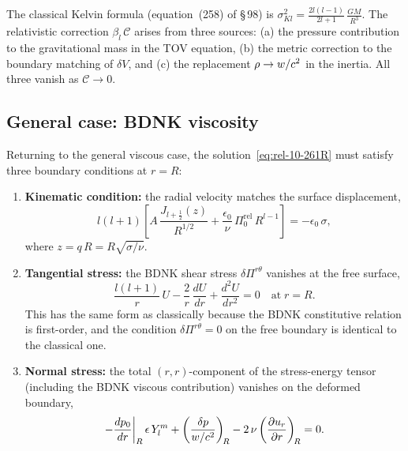 \begin{relcorrection}
The classical Kelvin formula (equation~(258) of \S\,98) is
$\sigma_{Kl}^{2} = \tfrac{2l(l-1)}{2l+1}\,\tfrac{GM}{R^{3}}$.
The relativistic correction $\beta_{l}\,\mathcal{C}$ arises from
three sources: (a) the pressure contribution to the gravitational
mass in the TOV equation, (b) the metric correction to the
boundary matching of $\delta V$, and (c) the replacement
$\rho \to w/c^{2}$ in the inertia.  All three vanish
as $\mathcal{C}\to 0$.
\end{relcorrection}

\subsection{General case: BDNK viscosity}
\label{sec:rel-10-98-general}

Returning to the general viscous case, the solution~\eqref{eq:rel-10-261R}
must satisfy three boundary conditions at $r = R$:

\begin{enumerate}
\item \textbf{Kinematic condition:} the radial velocity matches the
  surface displacement,
  \begin{equation}\label{eq:rel-10-264R}
    l(l+1)\!\left[
      A\,\frac{J_{l+\frac{1}{2}}(z)}{R^{1/2}}
      + \frac{\epsilon_{0}}{\nu}\,
        \Pi_{0}^{\mathrm{rel}}\,R^{l-1}
    \right]
    = -\epsilon_{0}\,\sigma,
  \end{equation}
  where $z = q\,R = R\sqrt{\sigma/\nu}$.

\item \textbf{Tangential stress:} the BDNK shear stress
  $\delta\Pi^{r\theta}$ vanishes at the free surface,
  \begin{equation}\label{eq:rel-10-266R}
    \frac{l(l+1)}{r}\,U - \frac{2}{r}\,\frac{dU}{dr}
    + \frac{d^{2}U}{dr^{2}} = 0
    \quad\text{at}\;r = R.
  \end{equation}
  This has the same form as classically because the BDNK constitutive
  relation is first-order, and the condition $\delta\Pi^{r\theta} = 0$
  on the free boundary is identical to the classical one.

\item \textbf{Normal stress:} the total $(r,r)$-component of the
  stress-energy tensor (including the BDNK viscous contribution)
  vanishes on the deformed boundary,
  \begin{equation}\label{eq:rel-10-272R}
    -\frac{dp_{0}}{dr}\bigg|_{R}\,\epsilon\,Y_{l}^{m}
    + \left(\frac{\delta p}{w/c^{2}}\right)_{\!R}
    - 2\,\nu
      \left(\frac{\partial u_{r}}{\partial r}\right)_{\!R}
    = 0.
  \end{equation}
\end{enumerate}

